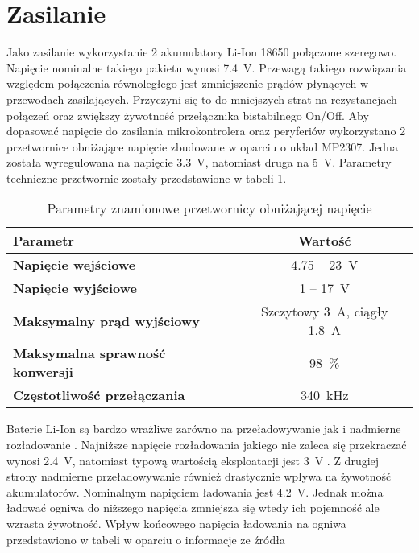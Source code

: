 	\section{Zasilanie}
	
		Jako zasilanie wykorzystanie 2 akumulatory Li-Ion 18650 połączone szeregowo. Napięcie nominalne takiego pakietu wynosi \SI{7.4}{\volt}. Przewagą takiego rozwiązania względem połączenia równoległego jest zmniejszenie prądów płynących w przewodach zasilających. Przyczyni się to do mniejszych strat na rezystancjach połączeń oraz zwiększy żywotność przełącznika bistabilnego On/Off. Aby dopasować napięcie do zasilania mikrokontrolera oraz peryferiów wykorzystano 2 przetwornice obniżające napięcie zbudowane w oparciu o układ MP2307. Jedna została wyregulowana na napięcie \SI{3.3}{\volt}, natomiast druga na \SI{5}{\volt}. Parametry techniczne przetwornic zostały przedstawione w tabeli \ref{tab:PrzetwornicaStepDown}.
		
		\begin{table}[H]
			\centering
			\begin{tabular}{|l|c|} \hline
				\textbf{Parametr} & Wartość \\
				\hline
				\hline  \textbf{Napięcie wejściowe}& 4.75 -- \SI{23}{\volt}  \\
				\hline 	\textbf{Napięcie wyjściowe} & 1 -- \SI{17}{\volt} \\
				\hline 	\textbf{Maksymalny prąd wyjściowy}& Szczytowy \SI{3}{\ampere}, ciągły \SI{1.8}{\ampere} \\
				\hline 	\textbf{Maksymalna sprawność konwersji}& \SI{98}{\percent} \\
				\hline 	\textbf{Częstotliwość przełączania}& \SI{340}{\kHz} \\
				\hline
			\end{tabular}
			\caption{Parametry znamionowe przetwornicy obniżającej napięcie}
			\label{tab:PrzetwornicaStepDown}
		\end{table}
	
		Baterie Li-Ion są bardzo wrażliwe zarówno na przeładowywanie \cite{ladowanieLiIon} jak i nadmierne rozładowanie \cite{rozladowywanieLiIon1, rozladowywanieLiIon2}. Najniższe napięcie rozładowania jakiego nie zaleca się przekraczać wynosi \SI{2.4}{\volt}, natomiast typową wartością eksploatacji jest \SI{3}{\volt} \cite{rozladowywanieLiIon2}. Z drugiej strony nadmierne przeładowywanie również drastycznie wpływa na żywotność akumulatorów. Nominalnym napięciem ładowania jest \SI{4.2}{\volt}. Jednak można ładować ogniwa do niższego napięcia zmniejsza się wtedy ich pojemność ale wzrasta żywotność. Wpływ końcowego napięcia ładowania na ogniwa przedstawiono w tabeli w oparciu o informacje ze źródła \cite{ladowanieLiIon}
		
